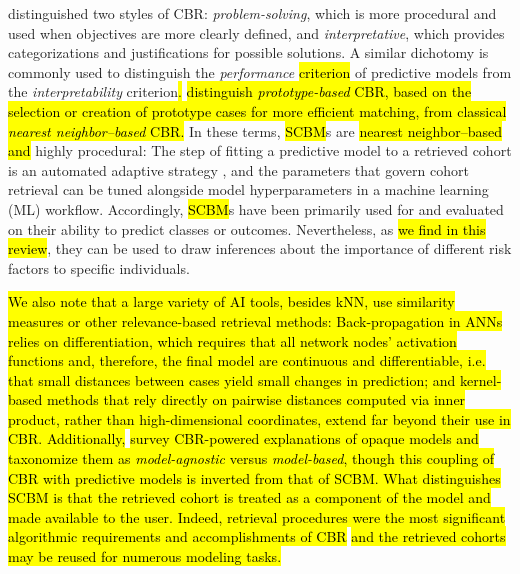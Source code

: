 \documentclass[sn-mathphys,Numbered,pdflatex]{sn-jnl}
\theoremstyle{remark}
\theoremstyle{definition}
\begin{document}
\citet{Kolodner1992} distinguished two styles of CBR:
\emph{problem-solving}, which is more procedural and used when
objectives are more clearly defined, and \emph{interpretative}, which
provides categorizations and justifications for possible solutions. A
similar dichotomy is commonly used to distinguish the \emph{performance}
\hl{criterion }of predictive models from the \emph{interpretability}
criterion\hl{.}
\citet{Rudin2022}\hl{ distinguish \emph{prototype-based} CBR, based on the selection or creation of prototype cases for more efficient matching, from classical \emph{nearest neighbor--based} CBR.}
In these terms, \hl{SCBM}s are \hl{nearest neighbor--based and }highly
procedural: The step of fitting a predictive model to a retrieved cohort
is an automated adaptive strategy \citep{Begum2011}, and the parameters
that govern cohort retrieval can be tuned alongside model
hyperparameters in a machine learning (ML) workflow. Accordingly,
\hl{SCBM}s have been primarily used for and evaluated on their ability
to predict classes or outcomes. Nevertheless, as
\hl{we find in this review}, they can be used to draw inferences about
the importance of different risk factors to specific individuals.

\hl{We also note that a large variety of AI tools, besides kNN, use similarity measures or other relevance-based retrieval methods: Back-propagation in ANNs relies on differentiation, which requires that all network nodes' activation functions and, therefore, the final model are continuous and differentiable, i.e. that small distances between cases yield small changes in prediction; and kernel-based methods that rely directly on pairwise distances computed via inner product, rather than high-dimensional coordinates, extend far beyond their use in CBR.
Additionally, }\citet{Schoenborn2021}\hl{ survey CBR-powered explanations of opaque models and taxonomize them as \emph{model-agnostic} versus \emph{model-based}, though this coupling of CBR with predictive models is inverted from that of SCBM.
What distinguishes SCBM is that the retrieved cohort is treated as a component of the model and made available to the user. Indeed, retrieval procedures were the most significant algorithmic requirements and accomplishments of CBR }\citep{Kolodner1992, Gierl1998}\hl{ and the retrieved cohorts may be reused for numerous modeling tasks.}
\end{document}
